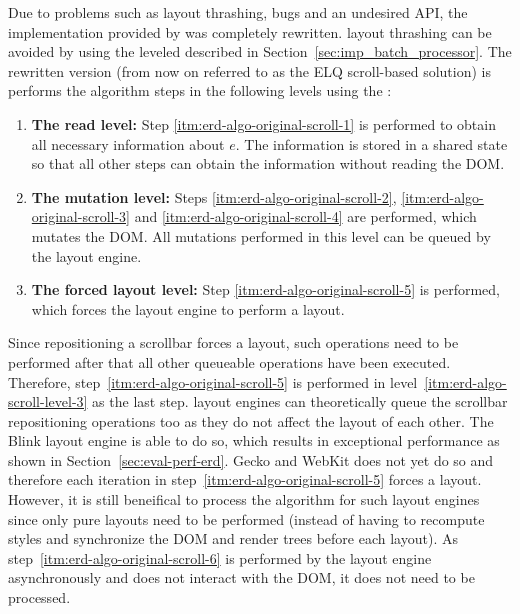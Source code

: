 \documentclass[a4paper,11pt]{kth-mag}
\begin{document}
        Due to problems such as \gls{layout thrashing}, bugs and an undesired \gls{API}, the implementation provided by \cite{eq_imp_css-element-queries} was completely rewritten.
        \Gls{layout thrashing} can be avoided by using the leveled  described in Section~\ref{sec:imp_batch_processor}.
        The rewritten version (from now on referred to as the \gls{ELQ} scroll-based solution) is performs the algorithm steps in the following levels using the :
        \begin{enumerate}
          \item\label{itm:erd-algo-scroll-level-1}
            \textbf{The read level:}
            Step \ref{itm:erd-algo-original-scroll-1} is performed to obtain all necessary information about $e$.
            The information is stored in a shared state so that all other steps can obtain the information without reading the \gls{DOM}.
          \item\label{itm:erd-algo-scroll-level-2}
            \textbf{The mutation level:}
            Steps \ref{itm:erd-algo-original-scroll-2}, \ref{itm:erd-algo-original-scroll-3} and \ref{itm:erd-algo-original-scroll-4} are performed, which mutates the \gls{DOM}.
            All mutations performed in this level can be queued by the \gls{layout engine}.
          \item\label{itm:erd-algo-scroll-level-3}
            \textbf{The forced layout level:}
            Step \ref{itm:erd-algo-original-scroll-5} is performed, which forces the \gls{layout engine} to perform a layout.
        \end{enumerate}
        Since repositioning a scrollbar forces a layout, such operations need to be performed after that all other queueable operations have been executed.
        Therefore, step~\ref{itm:erd-algo-original-scroll-5} is performed in level~\ref{itm:erd-algo-scroll-level-3} as the last step.
        \Glspl{layout engine} can theoretically queue the scrollbar repositioning operations too as they do not affect the layout of each other.
        The \gls{Blink} \gls{layout engine} is able to do so, which results in exceptional performance as shown in Section~\ref{sec:eval-perf-erd}.
        \gls{Gecko} and \gls{WebKit} does not yet do so and therefore each iteration in step~\ref{itm:erd-algo-original-scroll-5} forces a layout.
        However, it is still beneifical to  process the algorithm for such \glspl{layout engine} since only pure layouts need to be performed (instead of having to recompute styles and synchronize the \gls{DOM} and \glspl{render tree} before each layout).        
        As step~\ref{itm:erd-algo-original-scroll-6} is performed by the \gls{layout engine} asynchronously and does not interact with the \gls{DOM}, it does not need to be  processed.
\end{document}
